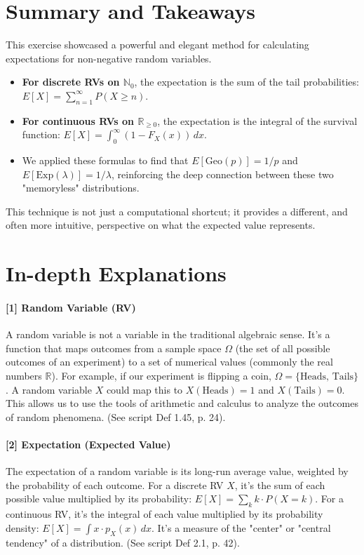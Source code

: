 \documentclass[11pt,a4paper]{article}
\begin{document}
\section{Summary and Takeaways}
This exercise showcased a powerful and elegant method for calculating expectations for non-negative random variables.
\begin{itemize}
    \item \textbf{For discrete RVs on $\mathbb{N}_0$}, the expectation is the sum of the tail probabilities: $E[X] = \sum_{n=1}^\infty P(X \ge n)$.
    \item \textbf{For continuous RVs on $\mathbb{R}_{\ge 0}$}, the expectation is the integral of the survival function: $E[X] = \int_0^\infty (1-F_X(x))\,dx$.
    \item We applied these formulas to find that $E[\text{Geo}(p)] = 1/p$ and $E[\text{Exp}(\lambda)] = 1/\lambda$, reinforcing the deep connection between these two "memoryless" distributions.
\end{itemize}
This technique is not just a computational shortcut; it provides a different, and often more intuitive, perspective on what the expected value represents.

\newpage
\section*{In-depth Explanations}
\hypertarget{note_rv}{}
\paragraph{[1] Random Variable (RV)}
A random variable is not a variable in the traditional algebraic sense. It's a function that maps outcomes from a sample space $\Omega$ (the set of all possible outcomes of an experiment) to a set of numerical values (commonly the real numbers $\mathbb{R}$). For example, if our experiment is flipping a coin, $\Omega = \{\text{Heads, Tails}\}$. A random variable $X$ could map this to $X(\text{Heads}) = 1$ and $X(\text{Tails}) = 0$. This allows us to use the tools of arithmetic and calculus to analyze the outcomes of random phenomena. (See script Def 1.45, p. 24).

\hypertarget{note_expectation}{}
\paragraph{[2] Expectation (Expected Value)}
The expectation of a random variable is its long-run average value, weighted by the probability of each outcome. For a discrete RV $X$, it's the sum of each possible value multiplied by its probability: $E[X] = \sum_k k \cdot P(X=k)$. For a continuous RV, it's the integral of each value multiplied by its probability density: $E[X] = \int x \cdot p_X(x) \,dx$. It's a measure of the "center" or "central tendency" of a distribution. (See script Def 2.1, p. 42).
\end{document}
